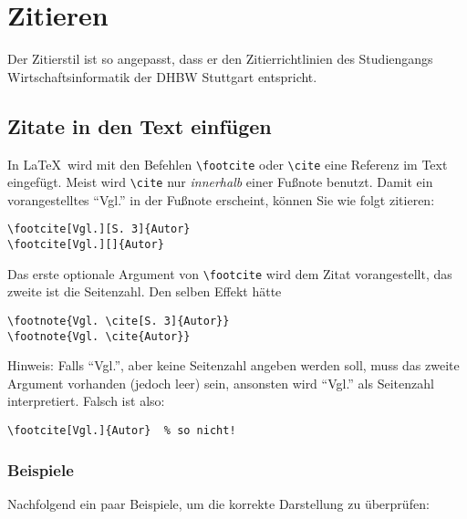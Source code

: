 \chapter{Zitieren}\label{chapter:zitate}

Der Zitierstil ist so angepasst, dass er den Zitierrichtlinien des Studiengangs Wirtschaftsinformatik der DHBW Stuttgart entspricht. 

\section{Zitate in den Text einfügen}
In \LaTeX\ wird mit den Befehlen \verb|\footcite| 
oder 
\verb|\cite|
eine Referenz im Text eingefügt. Meist wird \verb|\cite| nur \emph{innerhalb} einer Fußnote benutzt. 
Damit ein vorangestelltes \enquote{Vgl.} in der Fußnote erscheint, können Sie wie folgt zitieren:
\begin{verbatim}
\footcite[Vgl.][S. 3]{Autor}
\footcite[Vgl.][]{Autor}
\end{verbatim}

Das erste optionale Argument von \verb|\footcite| wird dem Zitat vorangestellt, das zweite ist die Seitenzahl. Den selben Effekt hätte
\begin{verbatim}
\footnote{Vgl. \cite[S. 3]{Autor}}
\footnote{Vgl. \cite{Autor}}
\end{verbatim}

Hinweis: Falls \enquote{Vgl.}, aber keine Seitenzahl angeben werden soll, muss das zweite Argument vorhanden (jedoch leer) sein, ansonsten wird \enquote{Vgl.} als Seitenzahl interpretiert. Falsch ist also: 
\begin{verbatim}
\footcite[Vgl.]{Autor}  % so nicht!
\end{verbatim}



\subsection{Beispiele}
Nachfolgend ein paar Beispiele, um die korrekte Darstellung zu überprüfen:

